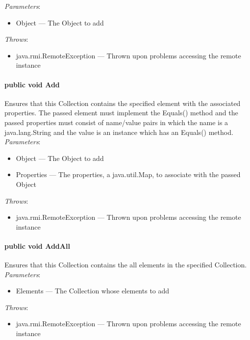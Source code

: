\documentclass[$Date: 2003/06/26 19:29:31 $]{glabarticle}
\begin{document}
\textit{Parameters}:
\begin{itemize}
\item[] Object --- The Object to add 
\end{itemize}

 \textit{Throws}:
 \begin{itemize}
 \item[] java.rmi.RemoteException --- Thrown upon problems accessing the remote instance 
 \end{itemize}

\paragraph{public void Add}

Ensures that this Collection contains the specified element with the
associated properties. The passed element must implement the Equals()
method and the passed properties must consist of name/value pairs in
which the name is a java.lang.String and the value is an instance which has an
Equals() method.\\

\textit{Parameters}:
\begin{itemize}
\item[] Object --- The Object to add 
\item[] Properties --- The properties, a java.util.Map, to associate with the passed Object 
\end{itemize}

 \textit{Throws}:
 \begin{itemize}
 \item[] java.rmi.RemoteException --- Thrown upon problems accessing the remote instance 
 \end{itemize}

\paragraph{public void AddAll}

Ensures that this Collection contains the all elements in the
specified Collection.\\

\textit{Parameters}:
\begin{itemize}
\item[] Elements --- The Collection whose elements to add 
\end{itemize}

 \textit{Throws}:
 \begin{itemize}
 \item[] java.rmi.RemoteException --- Thrown upon problems accessing the remote instance 
 \end{itemize}
\end{document}
